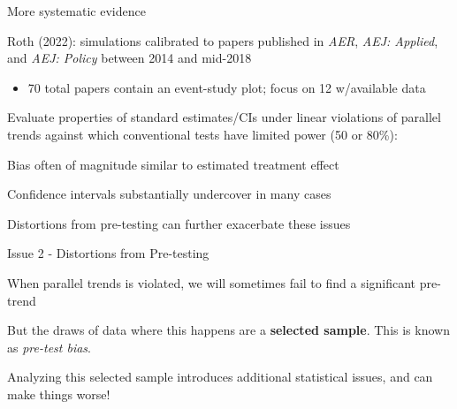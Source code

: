 \documentclass[aspectratio = 169, 13pt]{beamer}
\begin{document}
\begin{frame}[label = roth sims]{More systematic evidence}
	
	\begin{wideitemize}
		
		\item
		Roth (2022): simulations calibrated to papers published in \textit{AER}, \textit{AEJ: Applied}, and \textit{AEJ: Policy} between 2014 and mid-2018  
		\begin{itemize}
			\item
			70 total papers contain an event-study plot; focus on 12 w/available data
		\end{itemize}
		
		\item
		Evaluate properties of standard estimates/CIs under linear violations of parallel trends against which conventional tests have limited power (50 or 80\%):
		
		\begin{enumerate}
			\normalsize{
				\item
				Bias often of magnitude similar to estimated treatment effect
				
				\item
				Confidence intervals substantially undercover in many cases
				
				\item
				Distortions from pre-testing can further exacerbate these issues
			}
		\end{enumerate}
	\end{wideitemize}
	
\end{frame}

\begin{frame}{Issue 2 - Distortions from Pre-testing}
	\begin{wideitemize}
		\item
		When parallel trends is violated, we will sometimes fail to find a significant pre-trend
		
		\item
		But the draws of data where this happens are a \textbf{selected sample}. This is known as \textit{pre-test bias}.
		
		\item
		Analyzing this selected sample introduces additional statistical issues, and can make things worse!
		
	\end{wideitemize}
\end{frame}
\end{document}

